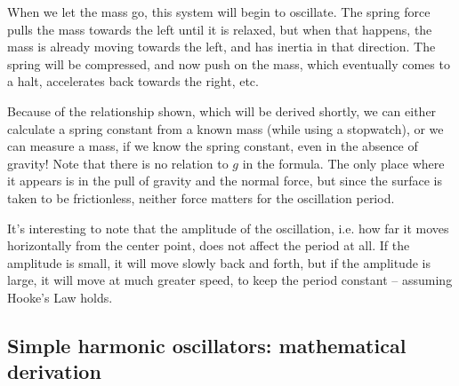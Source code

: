 \begin{figure}[H]
  \centering
{}
\caption{}
\end{figure}


When we let the mass go, this system will begin to oscillate. The spring force pulls the mass towards the left until it is relaxed, but when that happens, the mass is already moving towards the left, and has inertia in that direction. The spring will be compressed, and now push on the mass, which eventually comes to a halt, accelerates back towards the right, etc.

Because of the relationship shown, which will be derived shortly, we can either calculate a spring constant from a known mass (while using a stopwatch), or we can measure a mass, if we know the spring constant, even in the absence of gravity! Note that there is no relation to $g$ in the formula. The only place where it appears is in the pull of gravity and the normal force, but since the surface is taken to be frictionless, neither force matters for the oscillation period.

It's interesting to note that the amplitude of the oscillation, i.e. how far it moves horizontally from the center point, does not affect the period at all. If the amplitude is small, it will move slowly back and forth, but if the amplitude is large, it will move at much greater speed, to keep the period constant -- assuming Hooke's Law holds.

\subsection{Simple harmonic oscillators: mathematical derivation}

